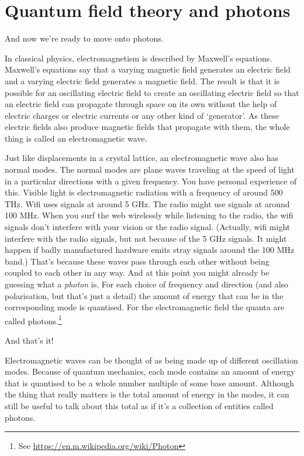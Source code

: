 \documentclass[a4paper]{article}
\begin{document}
\section{Quantum field theory and photons}
And now we're ready to move onto photons.

In classical physics, electromagnetism is described by Maxwell's equations.
Maxwell's equations say that a varying magnetic field generates an electric field and a varying electric field generates a magnetic field.
The result is that it is possible for an oscillating electric field to create an oscillating electric field so that an electric field can propagate through space on its own without the help of electric charges or electric currents or any other kind of `generator'.
As these electric fields also produce magnetic fields that propagate with them, the whole thing is called an electromagnetic wave.

Just like displacements in a crystal lattice, an electromagnetic wave also has normal modes.
The normal modes are plane waves traveling at the speed of light in a particular directions with a given frequency.
You have personal experience of this.
Visible light is electromagnetic radiation with a frequency of around 500 THz.
Wifi uses signals at around 5 GHz.
The radio might use signals at around 100 MHz.
When you surf the web wirelessly while listening to the radio, the wifi signals don't interfere with your vision or the radio signal.
(Actually, wifi might interfere with the radio signals, but not because of the 5 GHz signals. It might happen if badly manufactured hardware emits stray signals around the 100 MHz band.)
That's because these waves pass through each other without being coupled to each other in any way.
And at this point you might already be guessing what a {\em photon} is.
For each choice of frequency and direction (and also polarisation, but that's just a detail) the amount of energy that can be in the corresponding mode is quantised.
For the electromagnetic field the quanta are called photons.\footnote{See \url{https://en.m.wikipedia.org/wiki/Photon}}

And that's it!

Electromagnetic waves can be thought of as being made up of different oscillation modes.
Because of quantum mechanics, each mode contains an amount of energy that is quantised to be a whole number multiple of some base amount.
Although the thing that really matters is the total amount of energy in the modes, it can still be useful to talk about this total as if it's a collection of entities called photons.
\end{document}
